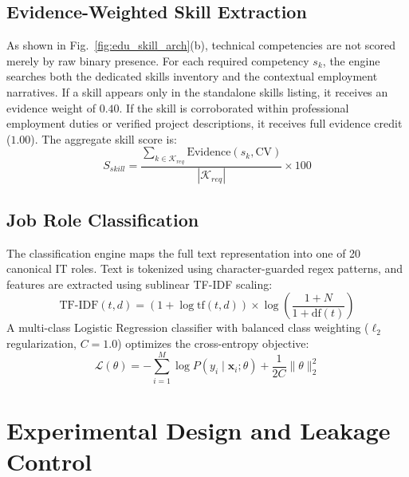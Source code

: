 \documentclass[conference]{IEEEtran}
\begin{document}
\subsection{Evidence-Weighted Skill Extraction}
As shown in Fig.~\ref{fig:edu_skill_arch}(b), technical competencies are not scored merely by raw binary presence. For each required competency $s_k$, the engine searches both the dedicated skills inventory and the contextual employment narratives. If a skill appears only in the standalone skills listing, it receives an evidence weight of $0.40$. If the skill is corroborated within professional employment duties or verified project descriptions, it receives full evidence credit ($1.00$). The aggregate skill score is:
\begin{equation}
S_{skill} = \frac{\sum_{k \in \mathcal{K}_{req}} \text{Evidence}(s_k, \text{CV})}{|\mathcal{K}_{req}|} \times 100
\end{equation}

\subsection{Job Role Classification}
The classification engine maps the full text representation into one of 20 canonical IT roles. Text is tokenized using character-guarded regex patterns, and features are extracted using sublinear TF-IDF scaling:
\begin{equation}
\text{TF-IDF}(t, d) = (1 + \log \text{tf}(t, d)) \times \log\left(\frac{1 + N}{1 + \text{df}(t)}\right)
\end{equation}
A multi-class Logistic Regression classifier with balanced class weighting ($\ell_2$ regularization, $C=1.0$) optimizes the cross-entropy objective:
\begin{equation}
\mathcal{L}(\theta) = -\sum_{i=1}^{M} \log P(y_i \mid \mathbf{x}_i; \theta) + \frac{1}{2C} \|\theta\|_2^2
\end{equation}

\section{Experimental Design and Leakage Control}
\end{document}
